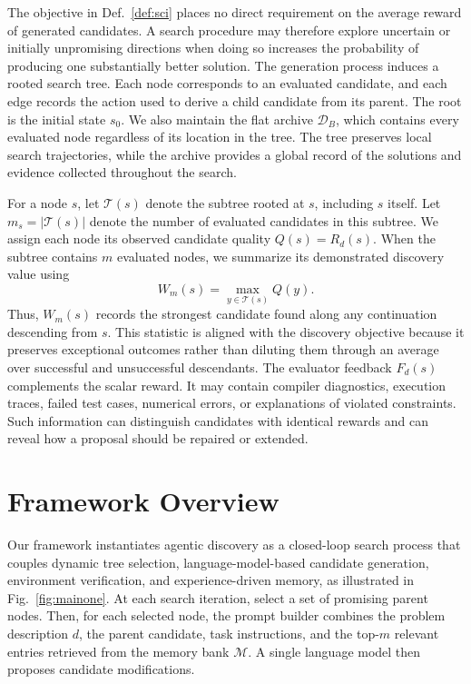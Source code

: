 \documentclass{article} %
\newcommand{\Dset}{\mathcal{D}}
\newcommand{\Tree}[1]{\mathcal{T}(#1)}
\begin{document}
The objective in Def.~\ref{def:sci} places no direct requirement on the average reward of generated candidates. A search procedure may therefore explore uncertain or initially unpromising directions when doing so increases the probability of producing one substantially better solution.
The generation process induces a rooted search tree. Each node corresponds to an evaluated candidate, and each edge records the action used to derive a child candidate from its parent. The root is the initial state $s_0$. We also maintain the flat archive $\Dset_B$, which contains every evaluated node regardless of its location in the tree. The tree preserves local search trajectories, while the archive provides a global record of the solutions and evidence collected throughout the search.

For a node $s$, let $\Tree{s}$ denote the subtree rooted at $s$, including $s$ itself. Let
$m_s = \lvert \Tree{s} \rvert$
denote the number of evaluated candidates in this subtree. We assign each node its observed candidate quality
$Q(s) = R_d(s).$
When the subtree contains $m$ evaluated nodes, we summarize its demonstrated discovery value using
\begin{equation}
W_m(s)
=
\max_{y \in \Tree{s}} Q(y).
\end{equation}
Thus, $W_m(s)$ records the strongest candidate found along any continuation descending from $s$. This statistic is aligned with the discovery objective because it preserves exceptional outcomes rather than diluting them through an average over successful and unsuccessful descendants.
The evaluator feedback $F_d(s)$ complements the scalar reward. It may contain compiler diagnostics, execution traces, failed test cases, numerical errors, or explanations of violated constraints. Such information can distinguish candidates with identical rewards and can reveal how a proposal should be repaired or extended. 
\section{Framework Overview}
\label{sec:framework}

Our framework instantiates agentic discovery as a closed-loop search process that couples dynamic tree selection, language-model-based candidate generation, environment verification, and experience-driven memory, as illustrated in Fig.~\ref{fig:mainone}. At each search iteration, select a set of promising parent nodes. Then, for each selected node, the prompt builder combines the problem description $d$, the parent candidate, task instructions, and the top-$m$ relevant entries retrieved from the memory bank $\mathcal{M}$. A single language model then proposes candidate modifications.
\end{document}
